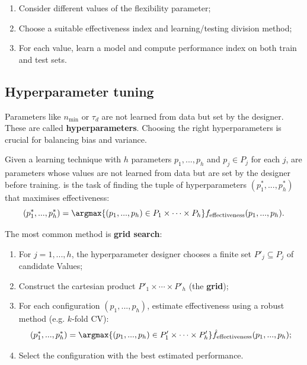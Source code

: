 \begin{exampleblock}
    \begin{enumerate}[leftmargin=*, noitemsep]
        \item Consider different values of the flexibility parameter;
        \item Choose a suitable effectiveness index and learning/testing division method;
        \item For each value, learn a model and compute performance index on both train and test sets.
    \end{enumerate}
\end{exampleblock}

\subsection{Hyperparameter tuning}
\label{subsec:hyperparameter-tuning}

Parameters like $n_{\min}$ or $\tau_d$ are not learned from data but set by the designer. These are called \textbf{hyperparameters}. Choosing the right hyperparameters is crucial for balancing bias and variance.

\begin{definitionblock}
Given a learning technique with $h$ parameters $p_1, ..., p_h$ and $p_j \in P_j$ for each $j$,  are parameters whose values are not learned from data but are set by the designer before training.  is the task of finding the tuple of hyperparameters $(p_1^*, ..., p_h^*)$ that maximises effectiveness:
$$
(p_1^*, ..., p_h^*) = \argmax{(p_1, ..., p_h) \in P_1 \times \cdots \times P_h} f_{\text{effectiveness}}(p_1, ..., p_h).
$$
\end{definitionblock}

 The most common method is \textbf{grid search}:

\begin{enumerate}[leftmargin=*, noitemsep]
    \item For $j = 1, ..., h$, the hyperparameter designer chooses a finite set $P'_j \subseteq P_j$ of candidate Values;
    \item Construct the cartesian product $P'_1 \times \cdots \times P'_h$ (the \textbf{grid});
    \item For each configuration \small{$(p_1, ..., p_h)$}, estimate effectiveness using a robust method (e.g. $k$-fold CV):
    $$
    (p_1^*, ..., p_h^*) = \argmax{(p_1, ..., p_h) \in P'_1 \times \cdots \times P'_h} \hat{f}_{\text{effectiveness}}(p_1, ..., p_h);
    $$

    \vspace{-0.7em}
    \item Select the configuration with the best estimated performance.
\end{enumerate}

